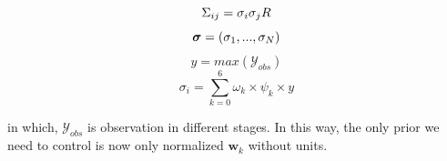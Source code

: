 \documentclass[12pt]{article}%
\theoremstyle{thmstyleone}%
\theoremstyle{thmstyletwo}%
\theoremstyle{thmstylethree}%
\begin{document}
\begin{equation}
        \Sigma_{ij} = \sigma_{i}\sigma_{j}R \\
        \end{equation}
        \begin{equation}
           \boldsymbol{\sigma} = (\sigma_1,...,\sigma_N) \\ 
        \end{equation}
\begin{equation}
    y = max(\mathcal{Y}_{obs})
\end{equation}
        \begin{equation}
\sigma_{i} = \sum_{k=0}^{6} \omega_{k} \times \psi_{k} \times y
        \end{equation}

in which, $\mathcal{Y}_{obs}$ is observation in different stages. In this way, the only prior we need to control is now only normalized $\boldsymbol{w}_{k}$ without units.
\end{document}
